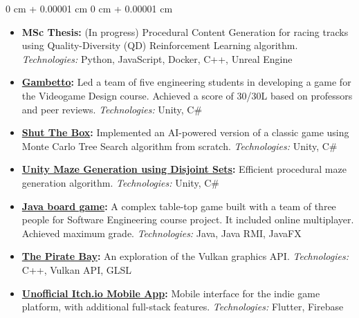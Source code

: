 \documentclass[11pt, letterpaper]{article}
\newenvironment{highlights}{
    \begin{itemize}[
        topsep=0.10 cm,
        parsep=0.10 cm,
        partopsep=0pt,
        itemsep=0pt,
        leftmargin=0 cm + 10pt
    ]
}{
    \end{itemize}
} %
\newenvironment{onecolentry}{
    \begin{adjustwidth}{
        0 cm + 0.00001 cm
    }{
        0 cm + 0.00001 cm
    }
}{
    \end{adjustwidth}
} %
\begin{document}
\begin{onecolentry}
    \begin{highlights}
        \item \textbf{MSc Thesis:} (In progress) Procedural Content Generation for racing tracks using Quality-Diversity (QD) Reinforcement Learning algorithm. \newline \textit{Technologies:} Python, JavaScript, Docker, C++, Unreal Engine
        \item \textbf{\href{https://github.com/martinopiaggi/gambetto}{Gambetto}:} Led a team of five engineering students in developing a game for the Videogame Design course. Achieved a score of 30/30L based on professors and peer reviews. 
        \newline \textit{Technologies:} Unity, C\#
        \item \textbf{\href{https://github.com/martinopiaggi/ShutTheBox}{Shut The Box}:} Implemented an AI-powered version of a classic game using Monte Carlo Tree Search algorithm from scratch.
        \newline \textit{Technologies:} Unity, C\#
        \item \textbf{\href{https://github.com/martinopiaggi/Unity-Maze-generation-using-disjoint-sets}{Unity Maze Generation using Disjoint Sets}:} Efficient procedural maze generation algorithm.
        \newline \textit{Technologies:} Unity, C\#
        \item 
        \textbf{\href{https://github.com/singhamrit99/ing-sw-2022-Piaggi-Perini-Singh}{Java board game}:} A complex table-top game built with a team of three people for Software Engineering course project. It included online multiplayer. Achieved maximum grade. 
         \newline \textit{Technologies:} Java, Java RMI, JavaFX
        \item \textbf{\href{https://github.com/lorenzo-morelli/The-Pirate-Bay}{The Pirate Bay}:} An exploration of the Vulkan graphics API. \newline \textit{Technologies:} C++, Vulkan API, GLSL
        \item \textbf{\href{https://github.com/martinopiaggi/Itch.io-mobile-app}{Unofficial Itch.io Mobile App}:} Mobile interface for the indie game platform, with additional full-stack features.  \newline \textit{Technologies:} Flutter, Firebase
    \end{highlights}
\end{onecolentry}
\end{document}
